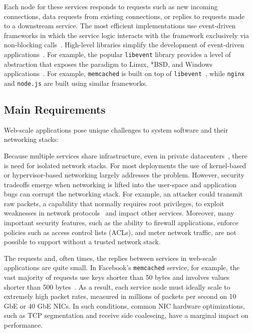 Each node for these services responds to requests such as new incoming
connections, data requests from existing connections, or replies to
requests made to a downstream service.  The most efficient
implementations use event-driven frameworks in which the service logic
interacts with the framework exclusively via non-blocking
calls~\cite{DBLP:conf/usenix/PaiDZ99,DBLP:conf/sosp/WelshCB01}.
High-level libraries simplify the development of event-driven
applications~\cite{libev,libuv,provos2003libevent}.  For example, the
popular \texttt{libevent} library provides a level of abstraction that
exposes the paradigm to Linux, *BSD, and Windows
applications~\cite{provos2003libevent}. For example,
\texttt{memcached} is built on top of
\texttt{libevent}~\cite{url:memcached}, while \texttt{nginx} and
\texttt{node.js} are built using similar frameworks.


\subsection{Main Requirements}
\label{sec:motivation:challenges}


Web-scale applications pose unique challenges to system
software and their networking stacks:

 Because multiple
services share infrastructure, even in private
datacenters~\cite{DBLP:journals/cacm/DeanB13,Hindman:2011:MPF,Schwarzkopf:2013:OFS},
there is need for isolated network stacks. For most deployments
the use of kernel-based or hypervisor-based networking largely
addresses the problem.  However, security tradeoffs emerge when
networking is lifted into the user-space and application bugs can
corrupt the networking stack. For example, an attacker could transmit
raw packets, a capability that normally requires root privileges,
to exploit weaknesses in network protocols~\cite{Bellovin04}
 and impact other services.
Moreover, many important security features, such as the ability to firewall
applications, enforce policies such as access control lists
(ACLs), and meter network traffic, are not possible to support
without a trusted network stack.


 The requests and, often times, the
replies between services in web-scale applications are quite small. In
Facebook's \texttt{memcached} service, for example, the vast majority
of requests use keys shorter than 50 bytes and involves values shorter
than 500 bytes~\cite{Atikoglu:2012:WAL}. As a result, each service
node must ideally scale to extremely high packet rates, measured in
millions of packets per second on 10 GbE or 40 GbE NICs.  In such
conditions, common NIC hardware optimizations, such as TCP
segmentation and receive side coalescing, have a marginal impact on
performance.

